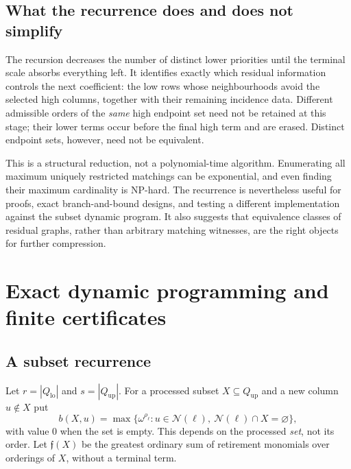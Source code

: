 \documentclass[11pt,a4paper]{article}
\theoremstyle{definition}
\theoremstyle{remark}
\newcommand{\Qlo}{Q_{\mathrm{lo}}}
\newcommand{\Qup}{Q_{\mathrm{up}}}
\newcommand{\Nb}{\mathcal N}
\begin{document}
\subsection{What the recurrence does and does not simplify}
The recursion decreases the number of distinct lower priorities until the
terminal scale absorbs everything left. It identifies exactly which residual
information controls the next coefficient: the low rows whose neighbourhoods
avoid the selected high columns, together with their remaining incidence
data. Different admissible orders of the \emph{same} high endpoint set need
not be retained at this stage; their lower terms occur before the final high
term and are erased. Distinct endpoint sets, however, need not be equivalent.

This is a structural reduction, not a polynomial-time algorithm. Enumerating
all maximum uniquely restricted matchings can be exponential, and even
finding their maximum cardinality is NP-hard. The recurrence is nevertheless
useful for proofs, exact branch-and-bound designs, and testing a different
implementation against the subset dynamic program. It also suggests that
equivalence classes of residual graphs, rather than arbitrary matching
witnesses, are the right objects for further compression.

\section{Exact dynamic programming and finite certificates}\label{nh:ur:sec:algorithm}
\setcounter{equation}{0}

\subsection{A subset recurrence}
Let $r=|\Qlo|$ and $s=|\Qup|$. For a processed subset $X\subseteq\Qup$ and a
new column $u\notin X$ put
\begin{equation}\label{nh:ur:eq:stepweight}
 b(X,u)=\max\{\omega^{\rho_\ell}:u\in\Nb(\ell),\ \Nb(\ell)\cap X=\varnothing\},
\end{equation}
with value $0$ when the set is empty. This depends on the processed
\emph{set}, not its order. Let $\mathfrak f(X)$ be the greatest ordinary sum
of retirement monomials over orderings of $X$, without a terminal term.
\end{document}
